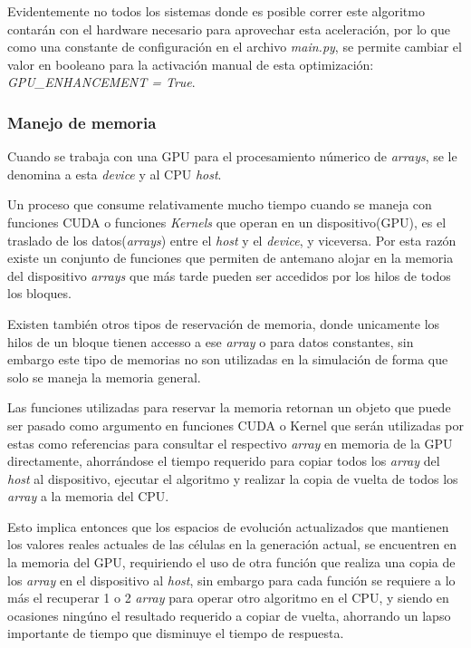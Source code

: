\documentclass[]{article}
\begin{document}
		Evidentemente no todos los sistemas donde es posible correr este algoritmo contarán con el hardware necesario para aprovechar esta aceleración, por lo que como una constante de configuración en el archivo \textit{main.py}, se permite cambiar el valor en booleano para la activación manual de esta optimización: \textit{GPU\_ENHANCEMENT = True}.
		
		\subsubsection{Manejo de memoria}
			Cuando se trabaja con una GPU para el procesamiento númerico de \textit{arrays}, se le denomina a esta \textit{device} y al CPU \textit{host}.
			
			Un proceso que consume relativamente mucho tiempo cuando se maneja con funciones CUDA o funciones \textit{Kernels} que operan en un dispositivo(GPU), es el traslado de los datos(\textit{arrays}) entre el \textit{host} y el \textit{device}, y viceversa. Por esta razón existe un conjunto de funciones que permiten de antemano alojar en la memoria del dispositivo \textit{arrays} que más tarde pueden ser accedidos por los hilos de todos los bloques.
			
			Existen también otros tipos de reservación de memoria, donde unicamente los hilos de un bloque tienen accesso a ese \textit{array} o para datos constantes, sin embargo este tipo de memorias no son utilizadas en la simulación de forma que solo se maneja la memoria general.
			
			Las funciones utilizadas para reservar la memoria retornan un objeto que puede ser pasado como argumento en funciones CUDA o Kernel que serán utilizadas por estas como referencias para consultar el respectivo \textit{array} en memoria de la GPU directamente, ahorrándose el tiempo requerido para copiar todos los \textit{array} del \textit{host} al dispositivo, ejecutar el algoritmo y realizar la copia de vuelta de todos los \textit{array} a la memoria del CPU.
			
			Esto implica entonces que los espacios de evolución actualizados que mantienen los valores reales actuales de las células en la generación actual, se encuentren en la memoria del GPU, requiriendo el uso de otra función que realiza una copia de los \textit{array} en el dispositivo al \textit{host}, sin embargo para cada función se requiere a lo más el recuperar 1 o 2 \textit{array} para operar otro algoritmo en el CPU, y siendo en ocasiones ningúno el resultado requerido a copiar de vuelta, ahorrando un lapso importante de tiempo que disminuye el tiempo de respuesta.
			
\end{document}
